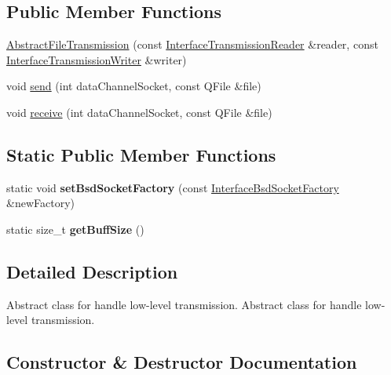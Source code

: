 \subsection*{Public Member Functions}
\begin{DoxyCompactItemize}
\item 
\hyperlink{classAbstractFileTransmission_a91b9eb10d6cf9fbaebf2c23c9cdeb81c}{Abstract\+File\+Transmission} (const \hyperlink{classInterfaceTransmissionReader}{Interface\+Transmission\+Reader} \&reader, const \hyperlink{classInterfaceTransmissionWriter}{Interface\+Transmission\+Writer} \&writer)
\item 
void \hyperlink{classAbstractFileTransmission_ad49bd97cf93532458f0eb2808af75e28}{send} (int data\+Channel\+Socket, const Q\+File \&file)
\item 
void \hyperlink{classAbstractFileTransmission_a0eaf52c2d4a568833867b59c01d0259b}{receive} (int data\+Channel\+Socket, const Q\+File \&file)
\end{DoxyCompactItemize}
\subsection*{Static Public Member Functions}
\begin{DoxyCompactItemize}
\item 
\mbox{\label{classAbstractFileTransmission_a3c05e06b2b543e8ab5a0d0850eed5c6b}} 
static void {\bfseries set\+Bsd\+Socket\+Factory} (const \hyperlink{classInterfaceBsdSocketFactory}{Interface\+Bsd\+Socket\+Factory} \&new\+Factory)
\item 
\mbox{\label{classAbstractFileTransmission_a7612e8c1f03dfdbd1f0e463b2935ba39}} 
static size\+\_\+t {\bfseries get\+Buff\+Size} ()
\end{DoxyCompactItemize}


\subsection{Detailed Description}
Abstract class for handle low-\/level transmission.  Abstract class for handle low-\/level transmission. 

\subsection{Constructor \& Destructor Documentation}
\mbox{\label{classAbstractFileTransmission_a91b9eb10d6cf9fbaebf2c23c9cdeb81c}} 
